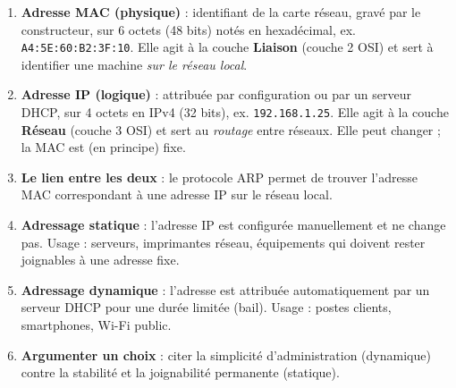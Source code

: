 \documentclass[11pt]{article}
\newcommand{\cle}[1]{{\popxbold\color{popdark}#1}}
\begin{document}
\begin{methode}
\begin{enumerate}
\item \textbf{Adresse MAC (physique)} : identifiant de la carte réseau, gravé par le constructeur, sur 6 octets (48 bits) notés en hexadécimal, ex. \texttt{A4:5E:60:B2:3F:10}. Elle agit à la couche \textbf{Liaison} (couche 2 OSI) et sert à identifier une machine \emph{sur le réseau local}.
\item \textbf{Adresse IP (logique)} : attribuée par configuration ou par un serveur DHCP, sur 4 octets en IPv4 (32 bits), ex. \texttt{192.168.1.25}. Elle agit à la couche \textbf{Réseau} (couche 3 OSI) et sert au \emph{routage} entre réseaux. Elle peut changer ; la MAC est (en principe) fixe.
\item \textbf{Le lien entre les deux} : le protocole \cle{ARP} permet de trouver l'adresse MAC correspondant à une adresse IP sur le réseau local.
\item \textbf{Adressage statique} : l'adresse IP est configurée manuellement et ne change pas. Usage : serveurs, imprimantes réseau, équipements qui doivent rester joignables à une adresse fixe.
\item \textbf{Adressage dynamique} : l'adresse est attribuée automatiquement par un serveur \cle{DHCP} pour une durée limitée (bail). Usage : postes clients, smartphones, Wi-Fi public.
\item \textbf{Argumenter un choix} : citer la simplicité d'administration (dynamique) contre la stabilité et la joignabilité permanente (statique).
\end{enumerate}
\end{methode}
\end{document}
